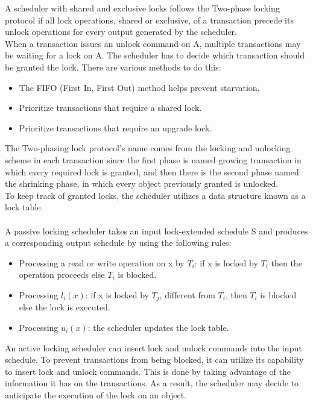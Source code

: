 \documentclass{article}
\begin{document}
\begin{itemize}
    A scheduler with shared and exclusive locks follows the Two-phase locking protocol if all lock operations, shared or exclusive, of a transaction precede its unlock operations for every output generated by the scheduler.
    \\
    When a transaction issues an unlock command on A, multiple transactions may be waiting for a lock on A. The scheduler has to decide which transaction should be granted the lock. There are various methods to do this:
    \begin{itemize}
        \item The FIFO (First In, First Out) method helps prevent starvation.
        \item Prioritize transactions that require a shared lock.
        \item Prioritize transactions that require an upgrade lock.
    \end{itemize}
\end{itemize}
The Two-phasing lock protocol's name comes from the locking and unlocking scheme in each transaction since the first phase is named growing transaction in which every required lock is granted, and then there is the second phase named the shrinking phase, in which every object previously granted is unlocked.
\\
To keep track of granted locks, the scheduler utilizes a data structure known as a lock table.
\\\\
A passive locking scheduler takes an input lock-extended schedule S and produces a corresponding output schedule by using the following rules:
\begin{itemize}
    \item Processing a read or write operation on x by $T_i$: if x is locked by $T_i$ then the operation proceeds else $T_i$ is blocked.
    \item Processing $l_i(x)$: if x is locked by $T_j$, different from $T_i$, then $T_i$ is blocked else the lock is executed.
    \item Processing $u_i(x)$: the scheduler updates the lock table.
\end{itemize}
An active locking scheduler can insert lock and unlock commands into the input schedule. To prevent transactions from being blocked, it can utilize its capability to insert lock and unlock commands. This is done by taking advantage of the information it has on the transactions. As a result, the scheduler may decide to anticipate the execution of the lock on an object.
\end{document}
